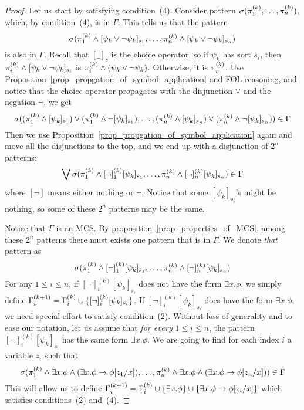 \documentclass{amsart}
\begin{document}
\begin{proof}
Let us start by satisfying condition~(4).
Consider pattern
$\sigma(\pi_1^{(k)} ,\dots, \pi_n^{(k)})$,
which, by condition~(4), is in $\Gamma$.
This tells us that the pattern
$$
\sigma(
\pi_1^{(k)} \wedge [\psi_k \vee \neg \psi_k]_{s_1}
,\dots, 
\pi_n^{(k)} \wedge [\psi_k \vee \neg \psi_k]_{s_n}
)
$$
is also in $\Gamma$.
Recall that $[\_]_s$ is the choice operator,
so if $\psi_k$ has sort $s_i$, then
$\pi_i^{(k)} \wedge [\psi_k \vee \neg \psi_k]_{s_i}$
is $\pi_i^{(k)} \wedge (\psi_k \vee \neg \psi_k) $.
Otherwise,
it is $\pi_i^{(k)}$.
Use Proposition~\ref{prop_propgation_of_symbol_application}
and FOL reasoning, and notice that the choice operator propagates
with the disjunction $\vee$ and the negation $\neg$,
we get
$$\sigma(
(\pi_1^{(k)} \wedge [\psi_k]_{s_1}) 
\vee 
(\pi_1^{(k)} \wedge \neg [\psi_k]_{s_1})
,\dots, 
(\pi_n^{(k)} \wedge [\psi_k]_{s_n}) 
\vee 
(\pi_n^{(k)} \wedge \neg [\psi_k]_{s_n})
) \in \Gamma $$
Then we use Proposition~\ref{prop_propgation_of_symbol_application} again
and move all the disjunctions to the top, 
and we end up with a disjunction of
$2^n$ patterns:
$$\bigvee
  \sigma(
  \pi_1^{(k)} \wedge [\neg]_1^{(k)} [\psi_k]_{s_1} ,\dots,
  \pi_n^{(k)} \wedge [\neg]_n^{(k)} [\psi_k]_{s_n}
) \in \Gamma
$$
where $[\neg]$ means either nothing or $\neg$.
Notice that some $[\psi_k]_{s_i}$'s might be nothing, 
so some of these $2^n$ patterns may be the same.

Notice that $\Gamma$ is an MCS.
By proposition~\ref{prop_properties_of_MCS}, among these $2^n$ patterns
there must exists one pattern that is in $\Gamma$.
We denote \emph{that} pattern as
$$
\sigma(
\pi_1^{(k)} \wedge [\neg]_1^{(k)} [\psi_k]_{s_1} ,\dots,
\pi_n^{(k)} \wedge [\neg]_n^{(k)} [\psi_k]_{s_n}
)
$$
For any $1 \le i \le n$,
if $[\neg]_i^{(k)} [\psi_k]_{s_i}$
does not have the form $\exists x . \phi$,
we simply define 
$\Gamma_i^{(k+1)} = \Gamma_i^{(k)} \cup \{ [\neg]_i^{(k)} [\psi_k]_{s_i} \}$.
If $[\neg]_i^{(k)} [\psi_k]_{s_i}$
does have the form $\exists x . \phi$,
we need special effort to satisfy condition~(2).
Without loss of generality
and to ease our notation,
let us assume that \emph{for every} $1 \le i \le n$,
the pattern $[\neg]_i^{(k)} [\psi_k]_{s_i}$ has the same form
$\exists x . \phi$.
We are going to find for each index $i$ a variable $z_i$
such that
$$
\sigma(
\pi_1^{(k)} \wedge  \exists x . \phi 
            \wedge (\exists x . \phi \to \phi[z_1/x]) ,\dots,
\pi_n^{(k)} \wedge  \exists x . \phi
            \wedge (\exists x . \phi \to \phi[z_n/x])
) \in \Gamma
$$
This will allow us to define
$\Gamma_i^{(k+1)} = \Gamma_i^{(k)} 
    \cup \{ \exists x . \phi \}
    \cup \{ \exists x . \phi \to \phi[z_i/x] \}
$
which satisfies conditions~(2) and~(4).


\end{proof}
\end{document}
